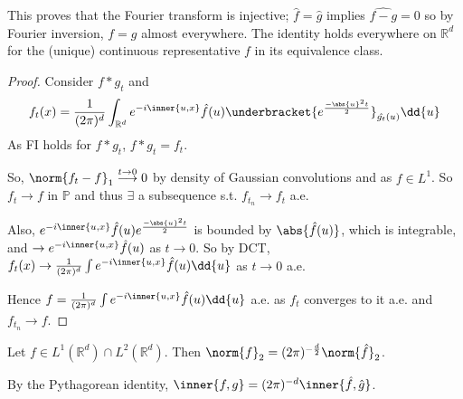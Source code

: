 \begin{remark}
	This proves that the Fourier transform is injective; $\hat f = \hat g$ implies $\widehat{f - g} = 0$ so by Fourier inversion, $f = g$ almost everywhere.
	The identity holds everywhere on $\mathbb R^d$ for the (unique) continuous representative $f$ in its equivalence class.
\end{remark}

\begin{proof}
	Consider $f \ast g_t$ and
	\begin{align*}
		f_t(x) = \frac{1}{(2\pi)^d} \int_{\mathbb R^d} e^{-i\inner{u,x}} \hat f(u) \underbracket{e^{\frac{-\abs{u}^2 t}{2}}}_{\hat{g_t}(u)} \dd{u}
	\end{align*}
	As FI holds for $f \ast g_t$, $f \ast g_t = f_t$.

	So, $\norm{f_t - f}_1 \overset{t \to 0}{\longrightarrow} 0$ by density of Gaussian convolutions and as $f \in L^1$.
	So $f_t \to f$ in $\mathbb{P}$ and thus $\exists$ a subsequence s.t. $f_{t_n} \to f_t$ a.e.

	Also, $e^{-i\inner{u,x}} \hat f(u) e^{\frac{-\abs{u}^2 t}{2}}$ is bounded by $\abs{\hat f(u)}$, which is integrable, and $\to e^{-i\inner{u,x}} \hat f(u)$ as $t \to 0$.
	So by DCT, $f_t(x) \to \frac{1}{(2\pi)^d} \int e^{-i\inner{u,x}} \hat f(u) \dd{u}$ as $t \to 0$ a.e.

	Hence $f = \frac{1}{(2\pi)^d} \int e^{-i\inner{u,x}} \hat f(u) \dd{u}$ a.e. as $f_t$ converges to it a.e. and $f_{t_n} \to f$.
\end{proof}

\begin{theorem}[Plancherel]
	Let $f \in L^1(\mathbb R^d) \cap L^2(\mathbb R^d)$.
	Then $\norm{f}_2 = (2\pi)^{-\frac{d}{2}} \norm{\hat f}_2$.
\end{theorem}

\begin{remark}
	By the Pythagorean identity, $\inner{f, g} = (2\pi)^{-d} \inner{\hat f, \hat g}$.
\end{remark}

